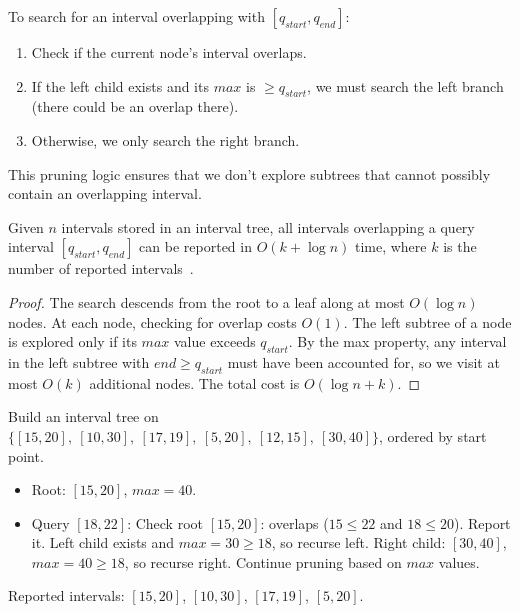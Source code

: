 To search for an interval overlapping with $[q_{start}, q_{end}]$:
\begin{enumerate}
    \item Check if the current node's interval overlaps.
    \item If the left child exists and its $\textit{max}$ is $\ge q_{start}$, we must search the left branch (there could be an overlap there).
    \item Otherwise, we only search the right branch.
\end{enumerate}

This pruning logic ensures that we don't explore subtrees that cannot possibly contain an overlapping interval.

\begin{theorem}
\label{thm:it_complexity_query}
Given $n$ intervals stored in an interval tree, all intervals overlapping a query interval $[q_{start}, q_{end}]$ can be reported in $O(k + \log n)$ time, where $k$ is the number of reported intervals~\cite{edelsbrunner1980}.
\end{theorem}
\begin{proof}
The search descends from the root to a leaf along at most $O(\log n)$ nodes. At each node, checking for overlap costs $O(1)$. The left subtree of a node is explored only if its $\textit{max}$ value exceeds $q_{start}$. By the max property, any interval in the left subtree with $\textit{end} \ge q_{start}$ must have been accounted for, so we visit at most $O(k)$ additional nodes. The total cost is $O(\log n + k)$.
\end{proof}

\begin{example}
\label{ex:it_query}
Build an interval tree on $\{[15,20],\ [10,30],\ [17,19],\ [5,20],\ [12,15],\ [30,40]\}$, ordered by start point.
\begin{itemize}
    \item Root: $[15,20]$, $\textit{max} = 40$.
    \item Query $[18,22]$: Check root $[15,20]$: overlaps ($15 \le 22$ and $18 \le 20$). Report it. Left child exists and $\textit{max}=30 \ge 18$, so recurse left. Right child: $[30,40]$, $\textit{max}=40 \ge 18$, so recurse right. Continue pruning based on $\textit{max}$ values.
\end{itemize}
Reported intervals: $[15,20]$, $[10,30]$, $[17,19]$, $[5,20]$.
\end{example}

